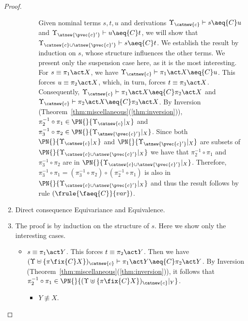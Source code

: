 \begin{proof}
\begin{enumerate}
\begin{itemize}
\begin{itemize}
        Given nominal terms $s,t,u$ and derivations $\Upsilon_{\catnew{c}} \vdash s \aeq{C} u$ and $\Upsilon_{\atnew{\pvec{c}'}}\vdash u \aeq{C} t$, we will show that $\Upsilon_{\catnew{c}\cup\atnew{\pvec{c}'}} \vdash s \aeq{C} t$. We establish the result by induction on $s$, whose structure influences the other terms. We present only the suspension case here, as it is the most interesting. For $s \equiv \pi_1\act X$, we have $\Upsilon_{\catnew{c}} \vdash \pi_1\act X \aeq{C} u$. This forces $u \equiv \pi_2\act X$, which, in turn, forces $t\equiv \pi_3\act X$. Consequently, $\Upsilon_{\catnew{c}} \vdash \pi_1\act X \aeq{C} \pi_2\act X$ and $\Upsilon_{\catnew{c}} \vdash \pi_2\act X \aeq{C} \pi_3\act X$. By Inversion (Theorem~\ref{thm:miscellaneous}(\ref{thm:inversion})), $\pi_2^{-1}\circ\pi_1 \in \PN{}{\Upsilon_{\catnew{c}}|_X}$ and $\pi_3^{-1}\circ\pi_2 \in \PN{}{\Upsilon_{\atnew{\pvec{c}'}}|_X}$. Since both $\PN{}{\Upsilon_{\catnew{c}}|_X}$ and $\PN{}{\Upsilon_{\atnew{\pvec{c}'}}|_X}$ are subsets of $\PN{}{\Upsilon_{\catnew{c}\cup\atnew{\pvec{c}'}}|_X}$ we have that $\pi_2^{-1}\circ\pi_1$ and
            $\pi_3^{-1}\circ\pi_2$ are in $\PN{}{\Upsilon_{\catnew{c}\cup\atnew{\pvec{c}'}}|_X}$.
            Therefore, $\pi_3^{-1}\circ\pi_1 = (\pi_3^{-1}\circ\pi_2)\circ(\pi_2^{-1}\circ\pi_1)$ is also in $\PN{}{\Upsilon_{\catnew{c}\cup\atnew{\pvec{c}'}}|_X}$
            and thus the result follows by rule $(\frule{\faeq{C}}{var})$.
    \end{itemize}
        \end{itemize}

        \item Direct consequence Equivariance and Equivalence.

        \item The proof is by induction on the structure of $s$. Here we show only the interesting cases.
       \begin{itemize}

        \item $s \equiv \pi_1 \act Y$. This forces $t \equiv \pi_2 \act Y$. Then we have $(\Upsilon\uplus\{\pi\fix{C} X\})_{\catnew{c}} \vdash \pi_1 \act Y \aeq{C} \pi_2 \act Y$. By Inversion (Theorem~\ref{thm:miscellaneous}(\ref{thm:inversion})), it follows that $\pi_2^{-1}\circ\pi_1\in \PN{}{(\Upsilon\uplus\{\pi\fix{C} X\})_{\catnew{c}}|_Y}$.

        \begin{itemize}
            \item $Y\not\equiv X$.


\end{itemize}
\end{itemize}
\end{enumerate}
\end{proof}
